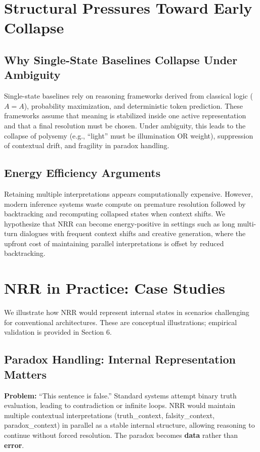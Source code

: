 \documentclass[11pt,a4paper]{article}
\begin{document}
\section{Structural Pressures Toward Early Collapse}

\subsection{Why Single-State Baselines Collapse Under Ambiguity}

Single-state baselines rely on reasoning frameworks derived from classical logic ($A = A$), probability maximization, and deterministic token prediction.
These frameworks assume that meaning is stabilized inside one active representation and that a final resolution must be chosen.
Under ambiguity, this leads to the collapse of polysemy (e.g., ``light'' must be illumination OR weight), suppression of contextual drift, and fragility in paradox handling.

\subsection{Energy Efficiency Arguments}

Retaining multiple interpretations appears computationally expensive.
However, modern inference systems waste compute on premature resolution followed by backtracking and recomputing collapsed states when context shifts.
We hypothesize that NRR can become energy-positive in settings such as long multi-turn dialogues with frequent context shifts and creative generation, where the upfront cost of maintaining parallel interpretations is offset by reduced backtracking.

\section{NRR in Practice: Case Studies}

We illustrate how NRR would represent internal states in scenarios challenging for conventional architectures. These are conceptual illustrations; empirical validation is provided in Section 6.

\subsection{Paradox Handling: Internal Representation Matters}

\textbf{Problem:} ``This sentence is false.''
Standard systems attempt binary truth evaluation, leading to contradiction or infinite loops.
NRR would maintain multiple contextual interpretations (truth\_context, falsity\_context, paradox\_context) in parallel as a stable internal structure, allowing reasoning to continue without forced resolution.
The paradox becomes \textbf{data} rather than \textbf{error}.
\end{document}
